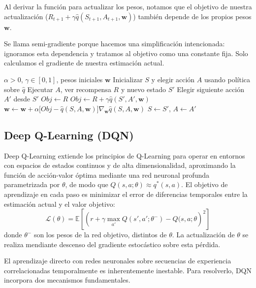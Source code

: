 Al derivar la función para actualizar los pesos, notamos que el objetivo de nuestra actualización ($R_{t+1} + \gamma \hat{q}(S_{t+1}, A_{t+1}, \mathbf{w})$) también depende de los propios pesos $\mathbf{w}$. 

Se llama semi-gradiente porque hacemos una simplificación intencionada: ignoramos esta dependencia y tratamos al objetivo como una constante fija. Solo calculamos el gradiente de nuestra estimación actual.

\begin{algorithm}[H]
\caption{SARSA Semi-gradiente para entornos continuos}
\label{alg:sarsa_semigrad}
\begin{algorithmic}[1]
\Require $\alpha > 0$, $\gamma \in [0, 1]$, pesos iniciales $\mathbf{w}$
    \State Inicializar $S$ y elegir acción $A$ usando política sobre $\hat{q}$
        \State Ejecutar $A$, ver recompensa $R$ y nuevo estado $S'$
        \State Elegir siguiente acción $A'$ desde $S'$
        \State $Obj \leftarrow R$
        \Else
        \State $Obj \leftarrow R + \gamma \hat{q}(S', A', \mathbf{w})$ 
        \EndIf
        \State $\mathbf{w} \leftarrow \mathbf{w} + \alpha \big[ Obj - \hat{q}(S, A, \mathbf{w}) \big] \nabla_{\mathbf{w}} \hat{q}(S, A, \mathbf{w})$
        \State $S \leftarrow S'$, $A \leftarrow A'$
    \EndWhile
\EndFor
\end{algorithmic}
\end{algorithm}

\subsection{Deep Q-Learning (DQN)}

Deep Q-Learning extiende los principios de Q-Learning para operar en entornos con espacios de estados continuos y de alta dimensionalidad, aproximando la función de acción-valor óptima mediante una red neuronal profunda parametrizada por $\theta$, de modo que $Q(s,a;\theta)\approx q^*(s,a)$. El objetivo de aprendizaje en cada paso es minimizar el error de diferencias temporales entre la estimación actual y el valor objetivo:
$$\mathcal{L}(\theta)=\mathbb{E}\left[\left(r + \gamma\max_{a'}Q(s',a';\theta^-)-Q(s,a;\theta\right)^2\right]$$
donde $\theta^-$ son los pesos de la red objetivo, distintos de $\theta$. La actualización de $\theta$ se realiza mendiante descenso del gradiente estocástico sobre esta pérdida.

El aprendizaje directo con redes neuronales sobre secuencias de experiencia correlacionadas temporalmente es inherentemente inestable. Para resolverlo, DQN incorpora dos mecanismos fundamentales.

